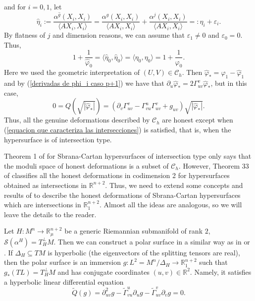 \documentclass{article}
\theoremstyle{remark}
\begin{document}
and for $i=0,1$, let
$$\hat{\eta}_i:=\frac{\alpha^{\hat{g}}(X_i,X_i)}{\langle AX_i,X_i\rangle}=\frac{\alpha^{g}(X_i,X_i)}{\langle AX_i,X_i\rangle}+\frac{\alpha^j(X_i,X_i)}{\langle AX_i,X_i\rangle}=:\eta_i+\varepsilon_i.$$
By flatness of $j$ and dimension reasons, we can assume that $\varepsilon_1\neq0$ and $\varepsilon_0=0$. Thus,
$$1+\frac{1}{\hat{\varphi}_0}=\langle\hat{\eta}_0,\hat{\eta}_0\rangle=\langle\eta_0,\eta_0\rangle=1+\frac{1}{\varphi_0}.$$
Here we used the geometric interpretation of $(U,V)\in\mathcal{C}_h$. 
Then $\hat{\varphi}_{*}=\varphi_1-\hat{\varphi}_1$ and by (\ref{derivadas de phi_i caso p+1}) we have that $\partial_u\hat{\varphi}_{*}=2\Gamma_{uv}^v\hat{\varphi}_{*}$, but in this case, 
\begin{equation*}
    0=Q(\sqrt{|\hat{\varphi}_{*}|})=(\partial_v\Gamma_{uv}^v-\Gamma_{vu}^u\Gamma_{uv}^v+g_{uv})\sqrt{|\hat{\varphi}_{*}|}.
\end{equation*}
Thus, all the genuine deformations described by $\mathcal{C}_h$ are honest except when (\ref{equacion que caracteriza las intersecciones}) is satisfied, that is, when the hypersurface is of intersection type.

Theorem 1 of \cite{DFT} for Sbrana-Cartan hypersurfaces of intersection type only says that the moduli space of honest deformations is a subset of $\mathcal{C}_h$. 
However, Theorem 33 of \cite{FF} classifies all the honest deformations in codimension 2 for hypersurfaces obtained as intersections in $\mathbb{R}^{n+2}$. Thus, we need to extend some concepts and results of \cite{FF} to describe the honest deformations of Sbrana-Cartan hypersurfaces which are intersections in $\mathbb{R}^{n+2}_1$. Almost all the ideas are analogous, so we will leave the details to the reader.

Let $H:M^{n}\rightarrow\mathbb{R}^{n+2}_\mu$ be a generic Riemannian submanifold of rank $2$, $\mathcal{S}(\alpha^H)=T^\perp_HM$. Then we can construct a polar surface in a similar way as in \cite{FF} or \cite{DF7}.
If $\Delta_H\subseteq TM$ is hyperbolic (the eigenvectors of the splitting tensors are real), then the polar surface is an immersion $g:L^2=M^n/\Delta_H\rightarrow\mathbb{R}^{n+2}_1$ such that $g_{*}(TL)=T^{\perp}_HM$ and has conjugate coordinates $(u,v)\in\mathbb{R}^2$. Namely, it satisfies a hyperbolic linear differential equation
$$\tilde{Q}(g)=\partial^2_{uv}g-\tilde{\Gamma}_{vu}^u\partial_ug-\tilde{\Gamma}_{uv}^v\partial_vg=0.$$
\end{document}
